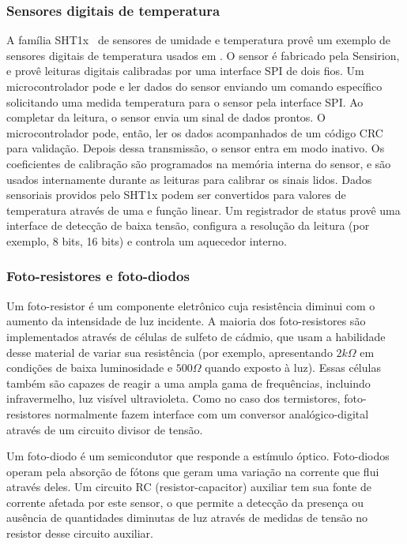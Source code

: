 \subsubsection{Sensores digitais de temperatura}

A família SHT1x~\cite{Sensirion:SHT1x:2005} de sensores de umidade e temperatura provê
um exemplo de sensores digitais de temperatura usados em \rssf. O sensor é
fabricado pela Sensirion, e provê leituras digitais calibradas por uma interface
SPI de dois fios. Um microcontrolador pode e ler dados do sensor enviando um
comando específico solicitando uma medida temperatura para o sensor pela
interface SPI. Ao completar da leitura, o sensor envia um sinal de dados
prontos. O microcontrolador pode, então, ler os dados acompanhados de um código
CRC para validação. Depois dessa transmissão, o sensor entra em modo inativo. Os
coeficientes de calibração são programados na memória interna do sensor, e são
usados internamente durante as leituras para calibrar os sinais lidos. Dados
sensoriais providos pelo SHT1x podem ser convertidos para valores de temperatura
através de uma e função linear. Um registrador de status provê uma interface de
detecção de baixa tensão, configura a resolução da leitura (por exemplo, 8 bits,
16 bits) e controla um aquecedor interno.

\subsubsection{Foto-resistores e foto-diodos}

Um foto-resistor é um componente eletrônico cuja resistência diminui com o
aumento da intensidade de luz incidente. A maioria dos foto-resistores são
implementados através de células de sulfeto de cádmio, que usam a habilidade
desse material de variar sua resistência (por exemplo, apresentando $2k\Omega$
em condições de baixa luminosidade e $500\Omega$ quando exposto à luz). Essas
células também são capazes de reagir a uma ampla gama de frequências, incluindo
infravermelho, luz visível ultravioleta. Como no caso dos termistores,
foto-resistores normalmente fazem interface com um conversor analógico-digital
através de um circuito divisor de tensão.

Um foto-diodo é um semicondutor que responde a estímulo óptico. Foto-diodos
operam pela absorção de fótons que geram uma variação na corrente que flui
através deles. Um circuito RC (resistor-capacitor) auxiliar tem sua fonte de
corrente afetada por este sensor, o que permite a detecção da presença ou
ausência de quantidades diminutas de luz através de medidas de tensão no
resistor desse circuito auxiliar.

